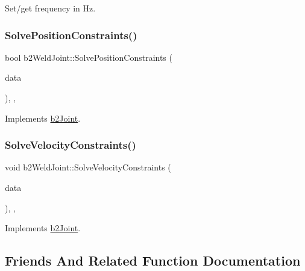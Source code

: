 Set/get frequency in Hz. 

\mbox{\label{classb2_weld_joint_a068ae45ce6577e27669121032c277015}} 
\subsubsection{\texorpdfstring{SolvePositionConstraints()}{SolvePositionConstraints()}}
{\footnotesize\ttfamily bool b2\+Weld\+Joint\+::\+Solve\+Position\+Constraints (\begin{DoxyParamCaption}\item[{const \mbox{\hyperlink{structb2_solver_data}{b2\+Solver\+Data}} \&}]{data }\end{DoxyParamCaption})\hspace{0.3cm}{\ttfamily [override]}, {\ttfamily [protected]}, {\ttfamily [virtual]}}



Implements \mbox{\hyperlink{classb2_joint_af767ac9aa494bd15cdf83dfe3e487d9c}{b2\+Joint}}.

\mbox{\label{classb2_weld_joint_a0367580735b117dcf9a4292df4daf883}} 
\subsubsection{\texorpdfstring{SolveVelocityConstraints()}{SolveVelocityConstraints()}}
{\footnotesize\ttfamily void b2\+Weld\+Joint\+::\+Solve\+Velocity\+Constraints (\begin{DoxyParamCaption}\item[{const \mbox{\hyperlink{structb2_solver_data}{b2\+Solver\+Data}} \&}]{data }\end{DoxyParamCaption})\hspace{0.3cm}{\ttfamily [override]}, {\ttfamily [protected]}, {\ttfamily [virtual]}}



Implements \mbox{\hyperlink{classb2_joint_ad302c8d02efcfe934158de0dc429348d}{b2\+Joint}}.



\subsection{Friends And Related Function Documentation}
\mbox{\label{classb2_weld_joint_a54ade8ed3d794298108d7f4c4e4793fa}} 
